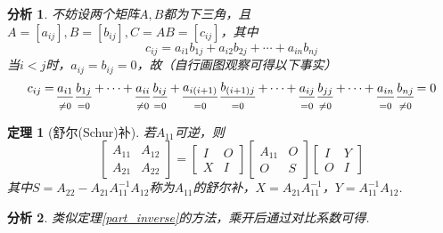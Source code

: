 \documentclass[11pt,UTF8]{ctexart}
\newtheorem{theorem}{定理}
\newtheorem*{analysis}{分析}
\newcommand{\underwrite}[3][]{%
  \genfrac{}{}{#1}{}{\textstyle #2}{\scriptstyle #3}
}
\begin{document}
\begin{analysis}
不妨设两个矩阵$A,B$都为下三角，且$A=[a_{ij}],B=[b_{ij}],C=AB=[c_{ij}]$，其中
\[c_{ij}=a_{i1}b_{1j}+a_{i2}b_{2j}+\cdots+a_{in}b_{nj}\]
当$i<j$时，$a_{ij}=b_{ij}=0$，故（自行画图观察可得以下事实）
\[\underwrite[0pt]{c_{ij}}{}\underwrite[0pt]{=}{}\underwrite{a_{i1}}{\ne 0}\underwrite{b_{1j}}{=0}\underwrite[0pt]{+\cdots+}{}\underwrite{a_{ii}}{\ne 0}\underwrite{b_{ij}}{=0}\underwrite[0pt]{+}{}\underwrite{a_{i(i+1)}}{=0}\underwrite{b_{(i+1)j}}{=0}\underwrite[0pt]{+\cdots+}{}\underwrite{a_{ij}}{=0}\underwrite{b_{jj}}{\ne 0}\underwrite[0pt]{+\cdots+}{}\underwrite{a_{in}}{=0}\underwrite{b_{nj}}{\ne 0}\underwrite[0pt]{= 0}{}\]
\end{analysis}
\begin{theorem}[舒尔(Schur)补]
若$A_{11}$可逆，则
\[\begin{bmatrix}A_{11}&A_{12}\\A_{21}&A_{22}\end{bmatrix}=\begin{bmatrix}I & O\\X & I\end{bmatrix}\begin{bmatrix}A_{11} & O\\O &S\end{bmatrix}\begin{bmatrix}I& Y\\O & I\end{bmatrix}\]
其中$S=A_{22}-A_{21}A_{11}^{-1}A_{12}$称为$A_{11}$的舒尔补，$X=A_{21}A_{11}^{-1}$，$Y=A_{11}^{-1}A_{12}$.
\end{theorem}
\begin{analysis}
类似定理\ref{part_inverse}的方法，乘开后通过对比系数可得.
\end{analysis}
\end{document}
